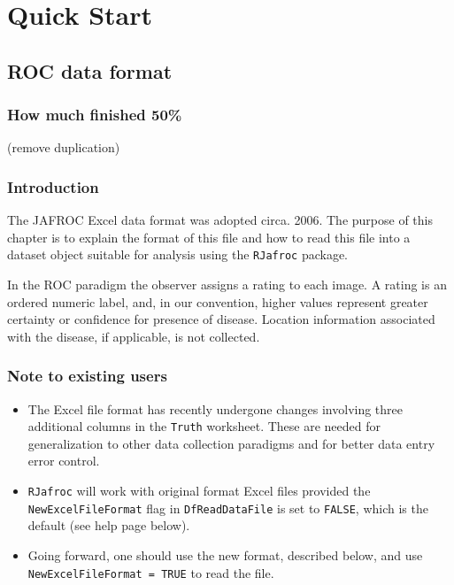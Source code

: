 \documentclass[
]{book}
\begin{document}
\hypertarget{part-quick-start}{%
\part*{Quick Start}\label{part-quick-start}}

\hypertarget{quick-start-roc}{%
\chapter{ROC data format}\label{quick-start-roc}}

\hypertarget{quick-start-roc-how-much-finished}{%
\section{How much finished 50\%}\label{quick-start-roc-how-much-finished}}

(remove duplication)

\hypertarget{quick-start-roc-intro}{%
\section{Introduction}\label{quick-start-roc-intro}}

The JAFROC Excel data format was adopted circa. 2006. The purpose of this chapter is to explain the format of this file and how to read this file into a dataset object suitable for analysis using the \texttt{RJafroc} package.

In the ROC paradigm the observer assigns a rating to each image. A rating is an ordered numeric label, and, in our convention, higher values represent greater certainty or confidence for presence of disease. Location information associated with the disease, if applicable, is not collected.

\hypertarget{quick-start-roc-note}{%
\section{Note to existing users}\label{quick-start-roc-note}}

\begin{itemize}
\item
  The Excel file format has recently undergone changes involving three additional columns in the \texttt{Truth} worksheet. These are needed for generalization to other data collection paradigms and for better data entry error control.
\item
  \texttt{RJafroc} will work with original format Excel files provided the \texttt{NewExcelFileFormat} flag in \texttt{DfReadDataFile} is set to \texttt{FALSE}, which is the default (see help page below).
\item
  Going forward, one should use the new format, described below, and use \texttt{NewExcelFileFormat\ =\ TRUE} to read the file.
\end{itemize}
\end{document}
